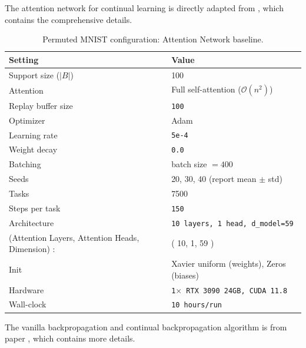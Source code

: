 \documentclass{article}
\begin{document}
\clearpage
The attention network for continual learning is directly adapted from \citep{wang2025replay}, which contains the comprehensive details.

\begin{table}[H]
\centering
\footnotesize
\caption{Permuted MNIST configuration: Attention Network baseline.}
\label{tab:pmnist_attention}
\begin{tabular}{@{}ll@{}}
\toprule
Setting & Value \\ \midrule
Support size ($|B|$) & 100 \\
Attention & Full self-attention ($\mathcal{O}(n^2)$) \\
Replay buffer size & \texttt{100} \\
Optimizer & Adam \\
Learning rate & \texttt{5e-4} \\
Weight decay & \texttt{0.0} \\
Batching & batch size $=400$ \\
Seeds & 20, 30, 40 (report mean $\pm$ std) \\
Tasks & 7500 \\
Steps per task & \texttt{150} \\
Architecture & \texttt{10 layers, 1 head, d\_model=59} \\
(Attention Layers, Attention Heads, Dimension) : & ( 10, 1, 59 ) \\ 
Init & Xavier uniform (weights), Zeros (biases) \\
Hardware & \texttt{1$\times$ RTX 3090 24GB, CUDA 11.8} \\
Wall-clock & \texttt{10 hours/run} \\
\bottomrule
\end{tabular}
\end{table}

The vanilla backpropagation and continual backpropagation algorithm is from paper \citep{dohare2024loss}, which contains more details.
\end{document}
